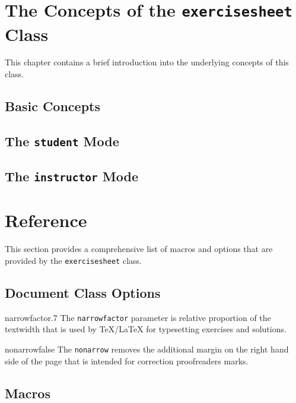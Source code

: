 \documentclass{report}
\def\exercisesheet{\texttt{exercisesheet}}
\begin{document}


\chapter{The Concepts of the \exercisesheet{} Class}

This chapter contains a brief introduction into the underlying
concepts of this class.

\section{Basic Concepts}

\section{The \lstinline{student} Mode}

\section{The \lstinline{instructor} Mode}

\chapter{Reference}

This section provides a comprehensive list of macros and options that
are provided by the \exercisesheet{} class.

\section{Document Class Options}

\begin{documentoption}{narrowfactor}{.7}
  The \lstinline{narrowfactor} parameter is relative proportion of the
  textwidth that is used by \TeX{}/\LaTeX{} for typesetting exercises
  and solutions.
\end{documentoption}

\begin{documentoption}{nonarrow}{false}
  The \lstinline{nonarrow} removes the additional margin on the right
  hand side of the page that is intended for correction proofreaders
  marks.
\end{documentoption}

\section{Macros}
\end{document}
